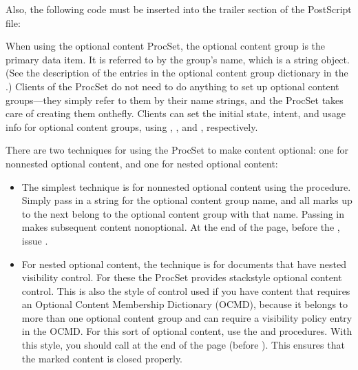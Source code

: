 \documentclass[letterpaper,12pt,english,openany,oneside]{sphinxmanual}
\begin{document}
Also, the following code must be inserted into the trailer section of the PostScript file:

\begin{sphinxVerbatim}[commandchars=\\\{\}]
       
\end{sphinxVerbatim}

When using the optional content ProcSet, the optional content group is the primary data item. It is referred to by the group’s name, which is a string object. (See the description of the entries in the optional content group dictionary in the  .) Clients of the ProcSet do not need to do anything to set up optional content groups—they simply refer to them by their name strings, and the ProcSet takes care of creating them on\sphinxhyphen{}the\sphinxhyphen{}fly. Clients can set the initial state, intent, and usage info for optional content groups, using  ,  , and  , respectively.

There are two techniques for using the ProcSet to make content optional: one for non\sphinxhyphen{}nested optional content, and one for nested optional content:
\begin{itemize}
\item {} 
The simplest technique is for non\sphinxhyphen{}nested optional content using the  procedure. Simply pass in a string for the optional content group name, and all marks up to the next  belong to the optional content group with that name. Passing in  makes subsequent content non\sphinxhyphen{}optional. At the end of the page, before the  , issue  .

\item {} 
For nested optional content, the technique is for documents that have nested visibility control. For these the ProcSet provides stack\sphinxhyphen{}style optional content control. This is also the style of control used if you have content that requires an Optional Content Membership Dictionary (OCMD), because it belongs to more than one optional content group and can require a visibility policy entry in the OCMD. For this sort of optional content, use the  and  procedures. With this style, you should call  at the end of the page (before  ). This ensures that the marked content is closed properly.

\end{itemize}
\end{document}
